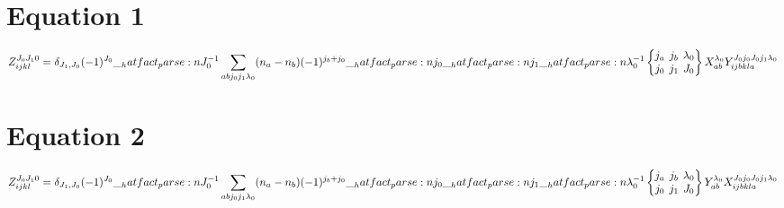 \documentclass{scrartcl}
\newcommand{\sixj}[6]{\begingroup\setlength{\arraycolsep}{0.2em}\begin{Bmatrix} #1 & #2 & #3 \\ #4 & #5 & #6 \end{Bmatrix}\endgroup}
\begin{document}
\section{Equation 1}
\begin{dmath*}
Z_{i j k l}^{{J}_{0} {J}_{1} 0} = \delta_{{J}_{1},{J}_{0}} \* (-1)^{{J}_{0}} \* \hatfact{{J}_{0}^{-1}} \* \sum_{a b {j}_{0} {j}_{1} {{\lambda}}_{0}} \* (n_{a} -n_{b}) \* (-1)^{{j}_{b}+{j}_{0}} \* \hatfact{{j}_{0}} \* \hatfact{{j}_{1}} \* \hatfact{{{\lambda}}_{0}^{-1}} \* \sixj{{j}_{a}}{{j}_{b}}{{{\lambda}}_{0}}{{j}_{0}}{{j}_{1}}{{J}_{0}} \* X_{a b}^{{{\lambda}}_{0}} \* Y_{i j b k l a}^{{J}_{0} {j}_{0} {J}_{0} {j}_{1} {{\lambda}}_{0}}
\end{dmath*}

\section{Equation 2}
\begin{dmath*}
Z_{i j k l}^{{J}_{0} {J}_{1} 0} = \delta_{{J}_{1},{J}_{0}} \* (-1)^{{J}_{0}} \* \hatfact{{J}_{0}^{-1}} \* \sum_{a b {j}_{0} {j}_{1} {{\lambda}}_{0}} \* (n_{a} -n_{b}) \* (-1)^{{j}_{b}+{j}_{0}} \* \hatfact{{j}_{0}} \* \hatfact{{j}_{1}} \* \hatfact{{{\lambda}}_{0}^{-1}} \* \sixj{{j}_{a}}{{j}_{b}}{{{\lambda}}_{0}}{{j}_{0}}{{j}_{1}}{{J}_{0}} \* Y_{a b}^{{{\lambda}}_{0}} \* X_{i j b k l a}^{{J}_{0} {j}_{0} {J}_{0} {j}_{1} {{\lambda}}_{0}}
\end{dmath*}
\end{document}
